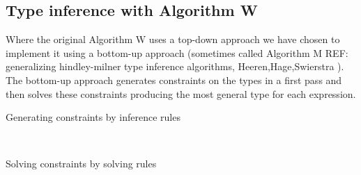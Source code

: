 \subsection{Type inference with Algorithm W}

Where the original Algorithm W uses a top-down approach we have chosen to implement it using a bottom-up approach (sometimes called Algorithm M REF: generalizing hindley-milner type inference algorithms, Heeren,Hage,Swierstra ). The bottom-up approach generates constraints on the types in a first pass and then solves these constraints producing the most general type for each expression.

\begin{description}
  \item[Generating constraints by inference rules] \hfill \\

  \item[Solving constraints by solving rules] \hfill \\

\end{description}
